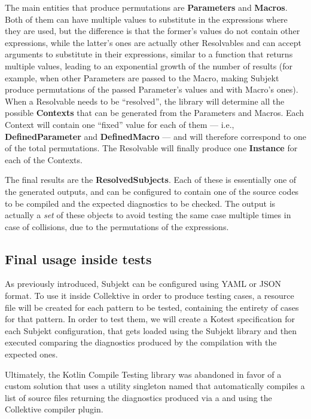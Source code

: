 \documentclass[12pt,a4paper,openright,twoside]{book}
\begin{document}
The main entities that produce permutations are \textbf{Parameters} and
\textbf{Macros}. Both of them can have multiple values to substitute in the
expressions where they are used, but the difference is that the former's values
do not contain other expressions, while the latter's ones are actually other
Resolvables and can accept arguments to substitute in their expressions, similar
to a function that returns multiple values, leading to an exponential growth
of the number of results (for example, when other Parameters are passed to the
Macro, making Subjekt produce permutations of the passed Parameter's values and
with Macro's ones).
%
When a Resolvable needs to be ``resolved'', the library will determine
all the possible \textbf{Contexts} that can be generated from the Parameters and
Macros. Each Context will contain one ``fixed'' value for each of them --- i.e.,
\textbf{DefinedParameter} and \textbf{DefinedMacro} --- and will therefore
correspond to one of the total permutations.
%
The Resolvable will finally produce one \textbf{Instance} for each of the
Contexts.

The final results are the \textbf{ResolvedSubjects}. Each of these is
essentially one of the generated outputs, and can be configured to contain one
of the source codes to be compiled and the expected diagnostics to be checked.
%
The output is actually a \emph{set} of these objects to avoid testing the same
case multiple times in case of collisions, due to the permutations of the
expressions.

\subsection{Final usage inside tests}

As previously introduced, Subjekt can be configured using YAML or JSON format.
To use it inside Collektive in order to produce testing cases, a resource file
will be created for each pattern to be tested, containing the entirety of cases
for that pattern. In order to test them, we will create a Kotest specification
for each Subjekt configuration, that gets loaded using the Subjekt library and
then executed comparing the diagnostics produced by the compilation with the
expected ones.

Ultimately, the Kotlin Compile Testing library was abandoned in favor of a
custom solution that uses a utility singleton named
 that automatically compiles a list of source
files returning the diagnostics produced via a  and using
the Collektive compiler plugin. 
\end{document}
